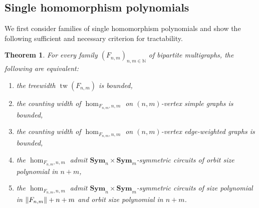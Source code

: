 \documentclass[11pt, DIV=15]{scrarticle}
\theoremstyle{definition}
\theoremstyle{plain}
\newtheorem{theorem}[definition]{Theorem}
\theoremstyle{remark}
\DeclarePairedDelimiter{\norm}{\lVert}{\rVert}
\DeclareMathOperator{\tw}{tw}
\newcommand{\Sym}{\mathbf{Sym}}
\begin{document}
%		
%		
%	
	
	
\subsection{Single homomorphism polynomials}

	We first consider families of single homomorphism polynomials and show the following sufficient and necessary criterion for tractability.

\begin{theorem}
	\label{thm:dichotomy-chromatic}
	For every family  $(F_{n,m})_{n,m \in \mathbb{N}}$ of bipartite multigraphs,
	the following are equivalent:
	\begin{enumerate}
		\item the treewidth $\tw(F_{n,m})$ is bounded,\label{it:hom1}
		\item the counting width of $\hom_{F_{n,m},n,m}$ on $(n,m)$-vertex simple graphs is bounded,\label{it:hom2}
		\item the counting width of $\hom_{F_{n,m},n,m}$ on $(n,m)$-vertex edge-weighted graphs is bounded,\label{it:hom3}
		\item the $\hom_{F_{n,m}, n, m}$ admit $\Sym_n \times \Sym_m$-symmetric circuits of orbit size polynomial in $n+m$,\label{it:hom5}
		\item the $\hom_{F_{n,m}, n, m}$ admit $\Sym_n \times \Sym_m$-symmetric circuits of size polynomial in $\norm{F_{n,m}} + n +m$ and orbit size polynomial in $n+m$.\label{it:hom4}
	\end{enumerate}
\end{theorem}
\end{document}
